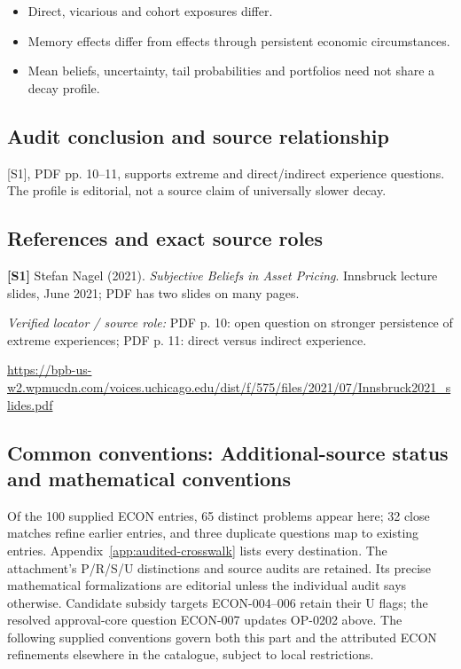 \documentclass[11pt,a4paper]{article}
\begin{document}
\begin{itemize}
\item Direct, vicarious and cohort exposures differ.
\item Memory effects differ from effects through persistent economic circumstances.
\item Mean beliefs, uncertainty, tail probabilities and portfolios need not share a decay profile.
\end{itemize}

\subsection*{Audit conclusion and source relationship}

[S1], PDF pp. 10--11, supports extreme and direct/indirect experience questions. The profile is editorial, not a source claim of universally slower decay.

\subsection*{References and exact source roles}

{\footnotesize\raggedright
\par\noindent\textbf{[S1]} Stefan Nagel (2021). \emph{Subjective Beliefs in Asset Pricing}. Innsbruck lecture slides, June 2021; PDF has two slides on many pages.\par \textit{Verified locator / source role:} PDF p. 10: open question on stronger persistence of extreme experiences; PDF p. 11: direct versus indirect experience.\par \url{https://bpb-us-w2.wpmucdn.com/voices.uchicago.edu/dist/f/575/files/2021/07/Innsbruck2021_slides.pdf}\par\smallskip
}

\subsection*{Common conventions: Additional-source status and mathematical conventions}

\label{audited:conventions}

Of the 100 supplied ECON entries, 65 distinct problems appear here; 32 close
matches refine earlier entries, and three duplicate questions map to existing
entries. Appendix~\ref{app:audited-crosswalk} lists every destination.
The attachment's P/R/S/U distinctions and source audits are retained. Its
precise mathematical formalizations are editorial unless the individual audit
says otherwise. Candidate subsidy targets ECON-004--006 retain their U flags;
the resolved approval-core question ECON-007 updates OP-0202 above.
The following supplied conventions govern both this part and the attributed
ECON refinements elsewhere in the catalogue, subject to local restrictions.
\end{document}
